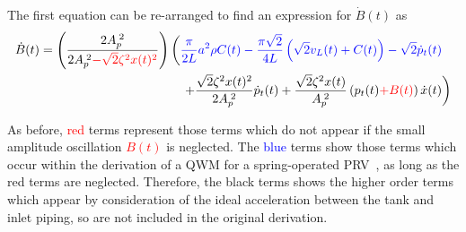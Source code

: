 The first equation can be re-arranged to find an expression for $\dot{B}(t)$ as
~
\begin{equation}  \label{eq: QWMFullDiffB}
\begin{split}
    \dot{B}(t) = \left( \frac{2 A_p\power{2}}{2 A_p\power{2} \textcolor{Red}{- \sqrt{2} \zeta^2 x(t)^2}} \right)
    &\left( \textcolor{Blue}{
    \frac{\pi}{2L} a^2 \rho C(t) - \frac{\pi \sqrt{2}}{4L} \left( \sqrt{2} v_L(t) + C(t) \right) - \sqrt{2} \dot{p}_t(t)}
     \right.  \\ & \quad \left.  %
    + \frac{\sqrt{2} \zeta^2 x(t)^2}{2 A_p\power{2}} \dot{p}_t(t) + \frac{\sqrt{2} \zeta^2 x(t)}{A_p\power{2}} \left( p_t(t) \textcolor{Red}{+ B(t)} \right) \dot{x}(t)
    \right)
\end{split}
\end{equation}

As before, \textcolor{Red}{red} terms represent those terms which do not appear if the small amplitude oscillation \textcolor{Red}{$B(t)$} is neglected. The \textcolor{Blue}{blue} terms show those terms which occur within the derivation of a QWM for a spring-operated PRV~\cite{Hos2015ModelPipe}, as long as the red terms are neglected. Therefore, the black terms shows the higher order terms which appear by consideration of the ideal acceleration between the tank and inlet piping, so are not included in the original derivation.

